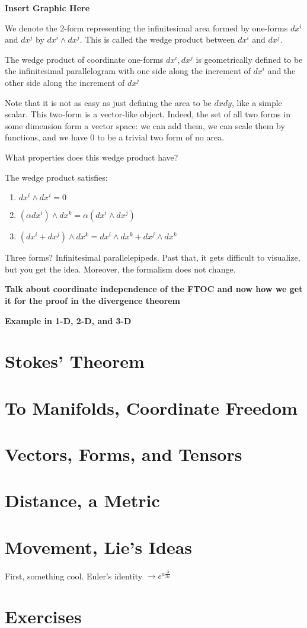 \documentclass[../master.tex]{subfiles}
\begin{document}
	\textbf{Insert Graphic Here}
	
	We denote the 2-form representing the infinitesimal area formed by one-forms $dx^i$ and $dx^j$ by $dx^i \wedge dx^j$. This is called the wedge product between $dx^i$ and $dx^j$.
	
	\begin{concept}
		The wedge product of coordinate one-forms $dx^i, dx^j$ is geometrically defined to be the infinitesimal parallelogram with one side along the increment of $dx^i$ and the other side along the increment of $dx^j$
	\end{concept}
	
	Note that it is not as easy as just defining the area to be $dx dy$, like a simple scalar. This two-form is a vector-like object. Indeed, the set of all two forms in some dimension form a vector space: we can add them, we can scale them by functions, and we have $0$ to be a trivial two form of no area. 
	
	What properties does this wedge product have? 
	
	\begin{prop}
		The wedge product satisfies:
		\begin{enumerate}
			\item $dx^i \wedge dx^i = 0$
			\item $(\alpha dx^i) \wedge dx^k = \alpha (dx^i \wedge dx^j)$
			\item $(dx^i + dx^j) \wedge dx^k = dx^i \wedge dx^k + dx^j \wedge dx^k$
		\end{enumerate}
	\end{prop}
	
	Three forms? Infinitesimal parallelepipeds. Past that, it gets difficult to visualize, but you get the idea. Moreover, the formalism does not change.

	\textbf{Talk about coordinate independence of the FTOC and now how we get it for the proof in the divergence theorem}
	
	\textbf{Example in 1-D, 2-D, and 3-D}

\section{Stokes' Theorem}

\section{To Manifolds, Coordinate Freedom}

\section{Vectors, Forms, and Tensors}

\section{Distance, a Metric}

\section{Movement, Lie's Ideas}

	First, something cool. Euler's identity $\rightarrow e^{a \frac{\partial}{\partial x}}$

\section{Exercises}
\end{document}
